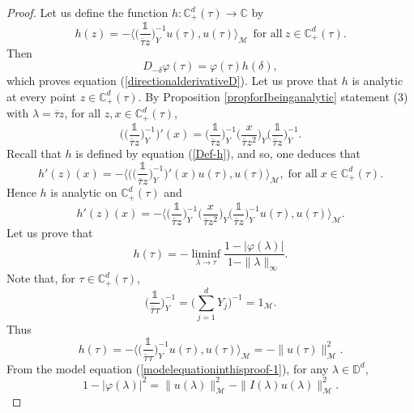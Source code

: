 \documentclass[11pt, reqno]{amsart}
\newcommand\1{\boldsymbol {1}}
\numberwithin{equation}{section}
\begin{document}
\begin{proof}
Let us define the function $h:\mathbb{C}_{+}^{d}(\tau)\rightarrow\mathbb{C}$ by
\begin{equation}\label{Def-h}
 h( z) = -\bigg\langle \bigg(\dfrac{\mathds{1}}{\overline{\tau} z}\bigg)_{Y}^{-1}u(\tau),u(\tau)\bigg\rangle_{\mathcal{M}}~~\text{for all}~ z\in\mathbb{C}_{+}^{d}(\tau).
 \end{equation}
Then
$$D_{-\delta}\varphi(\tau) =\varphi(\tau)h(\delta),$$
which proves equation (\ref{directionalderivativeD}).
Let us prove that $h$ is analytic at every point $z\in\mathbb{C}^{d}_{+}(\tau)$. By Proposition \ref{propforIbeinganalytic} statement (3) with $\lambda = \overline{\tau} z$, for all $ z,x\in\mathbb{C}^{d}_{+}(\tau)$,
$$\Bigg(\bigg(\dfrac{\mathds{1}}{\overline{\tau} z}\bigg)_{Y}^{-1}\Bigg)'(x) = \bigg(\dfrac{\mathds{1}}{\overline{\tau} z}\bigg)_{Y}^{-1}\bigg(\dfrac{x}{\overline{\tau} z^{2}}\bigg)_{Y}\bigg(\dfrac{\mathds{1}}{\overline{\tau} z}\bigg)_{Y}^{-1}.$$
Recall that $h$ is defined by equation (\ref{Def-h}), and so, one deduces that
$$h'( z)(x) = -\bigg\langle \Bigg(\bigg(\dfrac{\mathds{1}}{\overline{\tau} z}\bigg)_{Y}^{-1}\Bigg)'(x)u(\tau),u(\tau)\bigg\rangle_{\mathcal{M}}, \; \text{for all} \; x\in\mathbb{C}^{d}_{+}(\tau).$$
Hence $h$ is analytic on $\mathbb{C}_{+}^{d}(\tau)$ and
$$h'( z)(x) = -\bigg\langle \bigg(\dfrac{\mathds{1}}{\overline{\tau} z}\bigg)_{Y}^{-1}\bigg(\dfrac{x}{\overline{\tau} z^{2}}\bigg)_{Y}\bigg(\dfrac{\mathds{1}}{\overline{\tau} z}\bigg)_{Y}^{-1}u(\tau),u(\tau)\bigg\rangle_{\mathcal{M}}.$$
Let us prove that 
\begin{equation*}
            h(\tau) = -\liminf_{\lambda{\rightarrow}\tau} \dfrac{1-\lvert \varphi(\lambda)\rvert}{1-\|\lambda \|_{\infty}}.
\end{equation*}
Note that, for $\tau\in\mathbb{C}_{+}^{d}(\tau)$, 
$$\bigg(\dfrac{\mathds{1}}{\overline{\tau}\tau}\bigg)^{-1}_{Y} = \bigg(\sum_{j=1}^{d}Y_{j} \bigg)^{-1}= 1_{\mathcal{M}}.$$
Thus
\begin{equation}\label{hequationintheproofequalsnormu}
h(\tau)=-\bigg\langle \bigg(\dfrac{\mathds{1}}{\overline{\tau}\tau}\bigg)^{-1}_{Y}u(\tau),u(\tau)\bigg\rangle_{\mathcal{M}}=-\|u(\tau)\|^{2}_{\mathcal{M}}.
\end{equation}
From the model equation (\ref{modelequationinthisproof-1}), for any $\lambda\in\mathbb{D}^{d}$, 
\begin{equation}\label{equationdoublestar}
    1-\lvert \varphi(\lambda) \rvert^{2} = \|u(\lambda)\|^{2}_{\mathcal{M}}-\|I(\lambda)u(\lambda)\|^{2}_{\mathcal{M}}.
\end{equation}

\end{proof}
\end{document}
